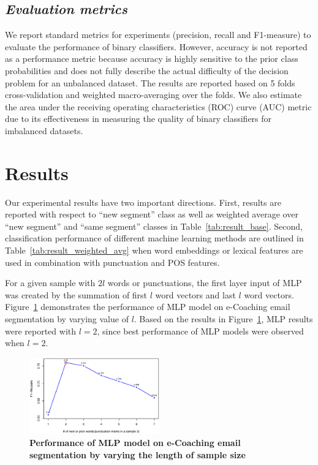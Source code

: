 \documentclass{amia}
\begin{document}
\subsection*{\textit{Evaluation metrics}}
We report standard metrics for experiments (precision, recall and F1-measure) to evaluate the performance of binary classifiers.\cite{aas1999text} However, accuracy is not reported as a performance metric because accuracy is highly sensitive to the prior class probabilities and does not fully describe the actual difficulty of the decision problem for an unbalanced dataset. The results are reported based on 5 folds cross-validation and weighted macro-averaging over the folds. We also estimate the area under the receiving operating characteristics (ROC) curve\cite{kumar2011receiver} (AUC) metric due to its effectiveness in measuring the quality of binary classifiers for imbalanced datasets. \cite{hu2015kernelized}

\section*{Results}
Our experimental results have two important directions. First, results are reported with respect to ``new segment'' class as well as weighted average over ``new segment'' and ``same segment'' classes in Table~\ref{tab:result_base}. Second, classification performance of different machine learning methods are outlined in Table~\ref{tab:result_weighted_avg} when word embeddings or lexical features are used in combination with punctuation and POS features.

For a given sample with $2l$ words or punctuations, the first layer input of MLP was created by the summation of first $l$ word vectors and last $l$ word vectors. Figure~\ref{fig:length-mlp} demonstrates the performance of MLP model on e-Coaching email segmentation by varying value of $l$. Based on the results in Figure~\ref{fig:length-mlp}, MLP results were reported with $l = 2$, since best performance of MLP models were observed when $l = 2$.  

\begin{figure}[!htb]
    \centering
    \includegraphics[width=0.5\textwidth]{figures/length-mlp.eps}
    \caption{\textbf{Performance of MLP model on e-Coaching email segmentation by varying the length of sample size}}
    \label{fig:length-mlp}
\end{figure}
\end{document}
